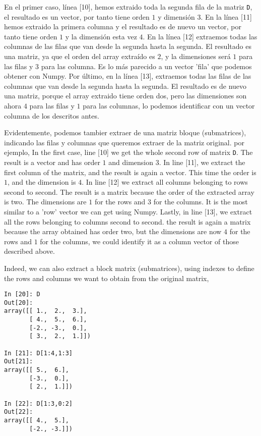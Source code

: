 \begin{paracol}{2}
En el primer caso, línea [10], hemos extraido toda la segunda fila de la matriz \texttt{D}, el resultado es un vector, por tanto tiene orden $1$ y dimensión $3$. En la línea [11] hemos extraido la primera columna y el resultado es de nuevo un vector, por tanto tiene orden $1$ y la dimensión esta vez $4$. En la línea [12] extraemos todas las columnas de las filas que van desde la segunda hasta la segunda. El resultado es una matriz, ya que el orden del array extraído es $2$, y la dimensiones será $1$ para las filas y $3$ para las columna. Es lo más parecido a un vector 'fila' que podemos obtener con Numpy. Por último, en la línea [13], extraemos todas las filas de las columnas que van desde la segunda hasta la segunda. El resultado es de nuevo una matriz, porque el array extraido tiene orden dos, pero las dimensiones son ahora $4$ para las filas y $1$ para las columnas, lo podemos identificar con un vector columna de los descritos antes.

Evidentemente, podemos tambier extraer de una matriz bloque (submatrices), indicando las filas y columnas que queremos extraer de la matriz original. por ejemplo,
\switchcolumn
In the first case, line [10] we get the whole second row of matrix \texttt{D}. The result is a vector and has order $1$ and dimension $3$. In line [11], we extract the first column of the matrix, and the result is again a vector. This time the order is $1$, and the dimension is $4$. In line [12] we extract all columns belonging to rows second to second. The result is a matrix because the order of the extracted array is two. The dimensions are $1$ for the rows and $3$ for the columns. It is the most similar to a 'row' vector we can get using Numpy. Lastly, in line [13], we extract all the rows belonging to columns second to second. the result is again a matrix because the array obtained has order two, but the dimensions are now $4$ for the rows and $1$ for the columns, we could identify it as a column vector of those described above. 

Indeed, we can also  extract a block matrix (submatrices), using indexes to define the rows and columns we want to obtain from the original matrix,
\end{paracol}

\begin{center}
 \begin{minipage}{0.3\textwidth}
    \begin{verbatim}
In [20]: D
Out[20]: 
array([[ 1.,  2.,  3.],
       [ 4.,  5.,  6.],
       [-2., -3.,  0.],
       [ 3.,  2.,  1.]])

In [21]: D[1:4,1:3]
Out[21]: 
array([[ 5.,  6.],
       [-3.,  0.],
       [ 2.,  1.]])

In [22]: D[1:3,0:2]
Out[22]: 
array([[ 4.,  5.],
       [-2., -3.]])
    \end{verbatim}
 \end{minipage}
\end{center}

